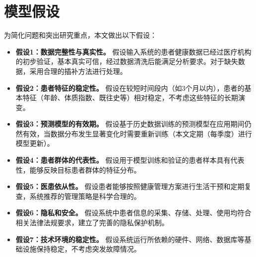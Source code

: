 
\section{模型假设}

为简化问题和突出研究重点，本文做出以下假设：

\begin{itemize}[itemindent=2em]
\item \textbf{假设1：数据完整性与真实性。} 假设输入系统的患者健康数据已经过医疗机构的初步验证，基本真实可信，经过数据清洗后能满足分析要求。对于缺失数据，采用合理的插补方法进行处理。

\item \textbf{假设2：患者特征的稳定性。} 假设在较短时间段内（如3个月以内），患者的基本特征（年龄、体质指数、既往史等）相对稳定，不考虑这些特征的长期演变。

\item \textbf{假设3：预测模型的有效期。} 假设基于历史数据训练的预测模型在应用期间仍然有效，当数据分布发生显著变化时需要重新训练（本文定期（每季度）进行模型更新）。

\item \textbf{假设4：患者群体的代表性。} 假设用于模型训练和验证的患者样本具有代表性，能够反映目标患者群体的特征分布。

\item \textbf{假设5：医患依从性。} 假设患者能够按照健康管理方案进行生活干预和定期复查，系统推荐的管理策略是科学合理的。

\item \textbf{假设6：隐私和安全。} 假设系统中患者信息的采集、存储、处理、使用均符合相关法律法规要求，建立了完善的隐私保护机制。

\item \textbf{假设7：技术环境的稳定性。} 假设系统运行所依赖的硬件、网络、数据库等基础设施保持稳定，不考虑突发故障情况。

\end{itemize}
